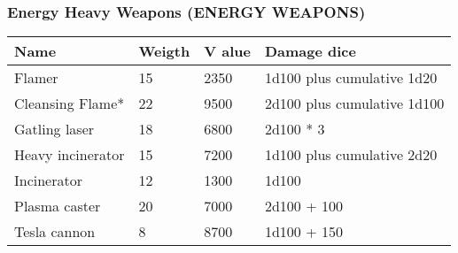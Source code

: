 
\subsubsection{Energy Heavy Weapons (ENERGY WEAPONS)}
\begin{longtable}{|p{4cm}|p{1.5cm}|p{1.5cm}|p{9cm}|}
\hline
\bfseries Name & \bfseries Weigth & \bfseries V alue & \bfseries Damage dice \\
\hline
\endhead
Flamer & 15 & 2350 & 1d100 plus cumulative 1d20 \\
Cleansing Flame* & 22 & 9500 & 2d100 plus cumulative 1d100 \\
Gatling laser & 18 & 6800 & 2d100 * 3 \\
Heavy incinerator & 15 & 7200 & 1d100 plus cumulative 2d20 \\
Incinerator & 12 & 1300 & 1d100 \\
Plasma caster & 20 & 7000 & 2d100 + 100 \\
Tesla cannon & 8 & 8700 & 1d100 + 150 \\
\hline
\end{longtable}
